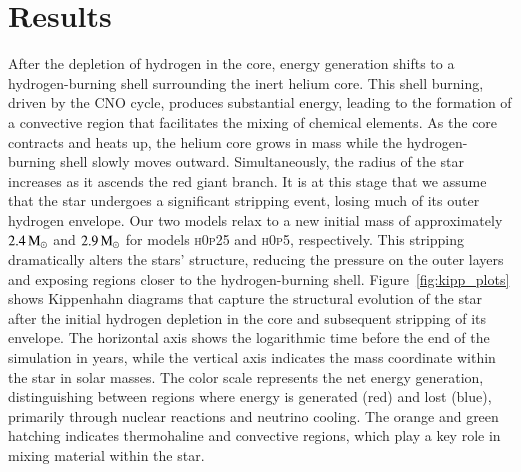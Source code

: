 \documentclass[main.tex]{subfiles}
\begin{document}
    \section{Results}\label{sec:ch3:results}
    After the depletion of hydrogen in the core, energy generation shifts to a hydrogen-burning shell surrounding the inert helium core. This shell burning, driven by the CNO cycle, produces substantial energy, leading to the formation of a convective region that facilitates the mixing of chemical elements. As the core contracts and heats up, the helium core grows in mass while the hydrogen-burning shell slowly moves outward. Simultaneously, the radius of the star increases as it ascends the red giant branch. It is at this stage that we assume that the star undergoes a significant stripping event, losing much of its outer hydrogen envelope. Our two models relax to a new initial mass of approximately $2.4\mathrm{\,M_\odot}$ and $2.9\mathrm{\,M_\odot}$ for models \textsc{h0p25} and \textsc{h0p5}, respectively.
    This stripping dramatically alters the stars' structure, reducing the pressure on the outer layers and exposing regions closer to the hydrogen-burning shell. Figure~\ref{fig:kipp_plots} shows Kippenhahn diagrams that capture the structural evolution of the star after the initial hydrogen depletion in the core and subsequent stripping of its envelope. The horizontal axis shows the logarithmic time before the end of the simulation in years, while the vertical axis indicates the mass coordinate within the star in solar masses. The color scale represents the net energy generation, distinguishing between regions where energy is generated (red) and lost (blue), primarily through nuclear reactions and neutrino cooling. The orange and green hatching indicates thermohaline and convective regions, which play a key role in mixing material within the star. 
\end{document}
